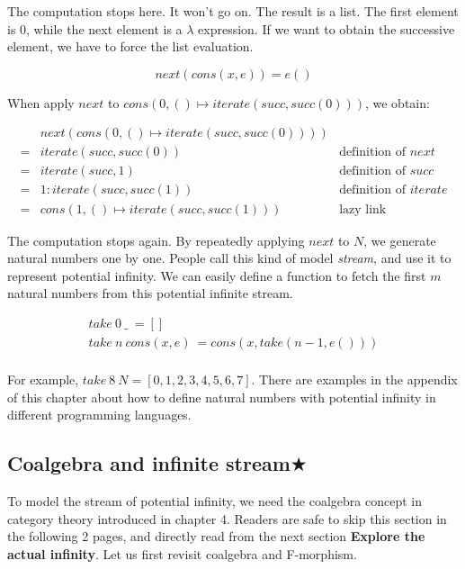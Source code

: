 \documentclass{article}
\begin{document}
The computation stops here. It won't go on. The result is a list. The first element is 0, while the next element is a $\lambda$ expression. If we want to obtain the successive element, we have to force the list evaluation.

\[
next(cons(x, e)) = e()
\]

When apply $next$ to $cons(0, () \mapsto iterate(succ, succ(0)))$, we obtain:

\[
\begin{array}{cll}
  & next(cons(0, () \mapsto iterate(succ, succ(0)))) & \\
= & iterate(succ, succ(0)) & \text{definition of } next\\
= & iterate(succ, 1) & \text{definition of } succ\\
= & 1 : iterate(succ, succ(1)) & \text{definition of } iterate\\
= & cons(1, () \mapsto iterate(succ, succ(1))) & \text{lazy link}
\end{array}
\]

The computation stops again. By repeatedly applying $next$ to $N$, we generate natural numbers one by one. People call this kind of model {\em stream}, and use it to represent potential infinity. We can easily define a function to fetch the first $m$ natural numbers from this potential infinite stream.

\[
\begin{array}{l}
take\ 0\ \_\ = [] \\
take\ n\ cons(x, e)\ = cons(x, take(n-1, e())) \\
\end{array}
\]

For example, $take\ 8\ N = [0, 1, 2, 3, 4, 5, 6, 7]$. There are examples in the appendix of this chapter about how to define natural numbers with potential infinity in different programming languages.

\begin{Exercise}
\end{Exercise}

\subsection{Coalgebra and infinite stream\texorpdfstring{$\bigstar$}{★}}

To model the stream of potential infinity, we need the coalgebra concept in category theory introduced in chapter 4. Readers are safe to skip this section in the following 2 pages, and directly read from the next section \textbf{Explore the actual infinity}. Let us first revisit coalgebra and F-morphism.
\end{document}
